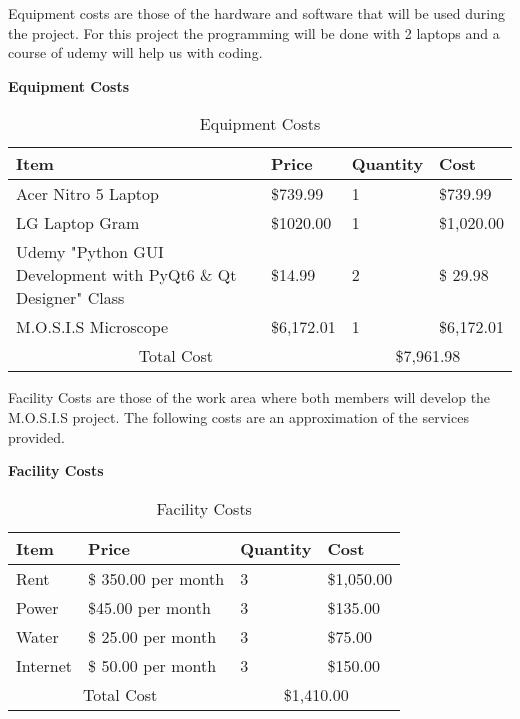 Equipment costs are those of the hardware and software that will be used during the project. For this project the programming will be done with 2 laptops and a course of udemy will help us with coding.\\
\begin{table}[H]
    \centering
   \textbf{Equipment Costs}
    \begin{tabular}{||m{}|m{}|m{}|m{}||}
        \hline
        Item & Price & Quantity & Cost\\
        \hline
        Acer Nitro 5 Laptop & \$739.99 & 1 & \$739.99\\
        \hline
        LG Laptop Gram&  \$1020.00 & 1 & \$1,020.00\\ 
        \hline
        Udemy "Python GUI Development with PyQt6 \& Qt Designer" Class & \$14.99 & 2 & \$ 29.98 \\
        \hline
        M.O.S.I.S Microscope & \$6,172.01 & 1 & \$6,172.01\\
        \hline
        \multicolumn{2}{||c|}{Total Cost} & \multicolumn{2}{c||}{\$7,961.98}\\
        \hline
       \end{tabular}
       \caption {Equipment Costs}
       \label{table:4}
\end{table}
Facility Costs are those of the work area where both members will develop the M.O.S.I.S project. The following costs are an approximation of the services provided. \\
\begin{table}[H]
    \centering
    \textbf{Facility Costs}
    \begin{tabular}{||m{}|m{}|m{}|m{}||}
        \hline
        Item & Price & Quantity & Cost\\
        \hline
        Rent &  \$ 350.00 per month & 3 & \$1,050.00\\ 
        \hline
        Power & \$45.00 per month & 3 & \$135.00 \\
        \hline
        Water & \$ 25.00 per month & 3 & \$75.00\\ 
        \hline
        Internet& \$ 50.00 per month & 3 & \$150.00\\ 
        \hline
        \multicolumn{2}{||c|}{Total Cost} & \multicolumn{2}{c||}{\$1,410.00}\\
        \hline
       \end{tabular}
       \caption {Facility Costs}
       \label{table:5}
\end{table}
